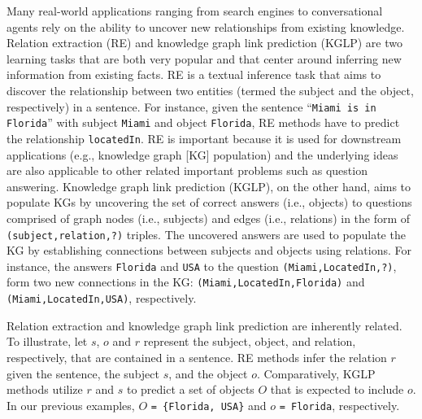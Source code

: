 Many real-world applications ranging from search engines to conversational agents rely on the ability to uncover new relationships from existing knowledge.
Relation extraction (RE) and knowledge graph link prediction (KGLP) are two learning tasks that are both very popular and that center around inferring new information from existing facts.
RE is a textual inference task that aims to discover the relationship between two entities (termed the subject and the object, respectively) in a sentence.
For instance, given the sentence ``\texttt{Miami is in Florida}'' with subject \texttt{Miami} and object \texttt{Florida}, RE methods have to predict the relationship \texttt{locatedIn}.
RE is important because it is used for downstream applications (e.g., knowledge graph [KG] population) and the underlying ideas are also applicable to other related important problems such as question answering. Knowledge graph link prediction (KGLP), on the other hand, aims to populate KGs by uncovering the set of correct answers (i.e., objects) to questions comprised of graph nodes (i.e., subjects) and edges (i.e., relations) in the form of \texttt{(subject,relation,?)} triples.
The uncovered answers are used to populate the KG by establishing connections between subjects and objects using relations.
For instance, the answers \texttt{Florida} and \texttt{USA} to the question \texttt{(Miami,LocatedIn,?)}, form two new connections in the KG: \texttt{(Miami,LocatedIn,Florida)} and \texttt{(Miami,LocatedIn,USA)}, respectively.

Relation extraction and knowledge graph link prediction are inherently related.
To illustrate, let $s$, $o$ and $r$ represent the subject, object, and relation, respectively, that are contained in a sentence.
RE methods infer the relation $r$ given the sentence, the subject $s$, and the object $o$.
Comparatively, KGLP methods utilize $r$ and $s$ to predict a set of objects $O$ that is expected to include $o$. In our previous examples, $O$ \texttt{= \{Florida, USA\}} and $o$ \texttt{= Florida}, respectively.

